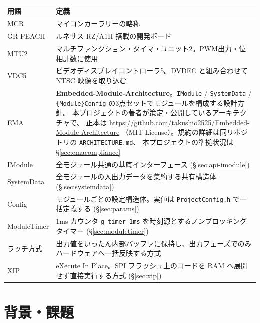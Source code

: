 \documentclass[a4paper,11pt,dvipdfmx]{jsarticle}
\begin{document}
\begin{tabularx}{\textwidth}{l X}
\toprule
\textbf{用語} & \textbf{定義} \\
\midrule
MCR       & マイコンカーラリーの略称 \\
GR-PEACH  & ルネサス RZ/A1H 搭載の開発ボード \\
MTU2      & マルチファンクション・タイマ・ユニット2。PWM出力・位相計数に使用 \\
VDC5      & ビデオディスプレイコントローラ5。DVDEC と組み合わせて NTSC 映像を取り込む \\
EMA       & \textbf{Embedded-Module-Architecture}。\texttt{IModule} / \texttt{SystemData} /
            \texttt{\{Module\}Config} の3点セットでモジュールを構成する設計方針。
            本プロジェクトの著者が策定・公開しているアーキテクチャで、
            正本は \url{https://github.com/takushio2525/Embedded-Module-Architecture}
            （MIT License）。規約の詳細は同リポジトリの \texttt{ARCHITECTURE.md}、
            本プロジェクトの準拠状況は \hyperref[sec:emacompliance]{§\ref*{sec:emacompliance}} \\
IModule   & 全モジュール共通の基底インターフェース (\hyperref[sec:api-imodule]{§\ref*{sec:api-imodule}}) \\
SystemData & 全モジュールの入出力データを集約する共有構造体 (\hyperref[sec:systemdata]{§\ref*{sec:systemdata}}) \\
Config    & モジュールごとの設定構造体。実値は \texttt{ProjectConfig.h} で一括定義する
            (\hyperref[sec:params]{§\ref*{sec:params}}) \\
ModuleTimer & 1ms カウンタ \texttt{g\_timer\_1ms} を時刻源とするノンブロッキングタイマー
            (\hyperref[sec:moduletimer]{§\ref*{sec:moduletimer}}) \\
ラッチ方式 & 出力値をいったん内部バッファに保持し、出力フェーズでのみハードウェアへ一括反映する方式 \\
XIP       & eXecute In Place。SPI フラッシュ上のコードを RAM へ展開せず直接実行する方式
            (\hyperref[sec:xip]{§\ref*{sec:xip}}) \\
\bottomrule
\end{tabularx}

\section{背景・課題}\label{sec:background}
\end{document}
